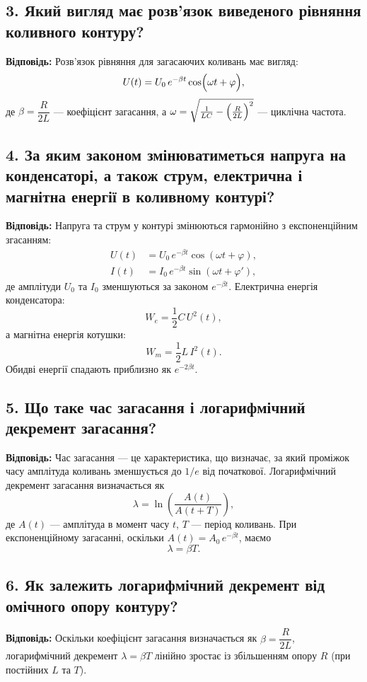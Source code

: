 \documentclass[12pt,a4paper]{article}
\begin{document}
    \subsection*{3. Який вигляд має розв'язок виведеного рівняння коливного контуру?}
    \textbf{Відповідь:}  
    Розв’язок рівняння для загасаючих коливань має вигляд:
    \[
    U(t)=U_0\, e^{-\beta t}\cos\Bigl(\omega t+\varphi\Bigr),
    \]
    де \(\beta=\dfrac{R}{2L}\) --- коефіцієнт загасання, а \(\omega=\sqrt{\frac{1}{LC}-\Bigl(\frac{R}{2L}\Bigr)^2}\) --- циклічна частота.

    \subsection*{4. За яким законом змінюватиметься напруга на конденсаторі, а також струм, електрична і магнітна енергії в коливному контурі?}
    \textbf{Відповідь:}  
    Напруга та струм у контурі змінюються гармонійно з експоненційним згасанням:
    \[
    \begin{aligned}
    U(t)&=U_0\, e^{-\beta t}\cos(\omega t+\varphi),\\[1ex]
    I(t)&=I_0\, e^{-\beta t}\sin(\omega t+\varphi'),
    \end{aligned}
    \]
    де амплітуди \(U_0\) та \(I_0\) зменшуються за законом \(e^{-\beta t}\).  
    Електрична енергія конденсатора:
    \[
    W_e=\frac{1}{2}C\,U^2(t),
    \]
    а магнітна енергія котушки:
    \[
    W_m=\frac{1}{2}L\,I^2(t).
    \]
    Обидві енергії спадають приблизно як \(e^{-2\beta t}\).

    \subsection*{5. Що таке час загасання і логарифмічний декремент загасання?}
    \textbf{Відповідь:}  
    Час загасання --- це характеристика, що визначає, за який проміжок часу амплітуда коливань зменшується до \(1/e\) від початкової.  
    Логарифмічний декремент загасання визначається як
    \[
    \lambda=\ln\!\left(\frac{A(t)}{A(t+T)}\right),
    \]
    де \(A(t)\) --- амплітуда в момент часу \(t\), \(T\) --- період коливань. При експоненційному загасанні, оскільки \(A(t)=A_0\,e^{-\beta t}\), маємо
    \[
    \lambda=\beta T.
    \]

    \subsection*{6. Як залежить логарифмічний декремент від омічного опору контуру?}
    \textbf{Відповідь:}  
    Оскільки коефіцієнт загасання визначається як \(\beta=\dfrac{R}{2L}\), логарифмічний декремент
    \(\lambda=\beta T\) лінійно зростає із збільшенням опору \(R\) (при постійних \(L\) та \(T\)).
\end{document}
